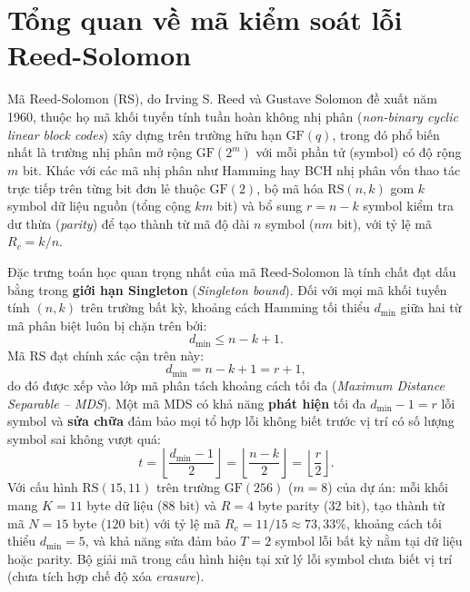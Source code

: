 \documentclass[12pt,a4paper]{report}
\begin{document}
\section{Tổng quan về mã kiểm soát lỗi Reed-Solomon}

Mã Reed-Solomon (RS), do Irving S. Reed và Gustave Solomon đề xuất năm 1960, thuộc họ mã khối tuyến tính tuần hoàn không nhị phân (\textit{non-binary cyclic linear block codes}) xây dựng trên trường hữu hạn $\text{GF}(q)$, trong đó phổ biến nhất là trường nhị phân mở rộng $\text{GF}(2^m)$ với mỗi phần tử (symbol) có độ rộng $m$ bit. Khác với các mã nhị phân như Hamming hay BCH nhị phân vốn thao tác trực tiếp trên từng bit đơn lẻ thuộc $\text{GF}(2)$, bộ mã hóa $\text{RS}(n, k)$ gom $k$ symbol dữ liệu nguồn (tổng cộng $km$ bit) và bổ sung $r = n - k$ symbol kiểm tra dư thừa (\textit{parity}) để tạo thành từ mã độ dài $n$ symbol ($nm$ bit), với tỷ lệ mã $R_c = k/n$.

Đặc trưng toán học quan trọng nhất của mã Reed-Solomon là tính chất đạt dấu bằng trong \textbf{giới hạn Singleton} (\textit{Singleton bound}). Đối với mọi mã khối tuyến tính $(n, k)$ trên trường bất kỳ, khoảng cách Hamming tối thiểu $d_{\min}$ giữa hai từ mã phân biệt luôn bị chặn trên bởi:
\begin{equation}
    d_{\min} \le n - k + 1.
    \label{eq:singleton-bound}
\end{equation}
Mã RS đạt chính xác cận trên này:
\begin{equation}
    d_{\min} = n - k + 1 = r + 1,
    \label{eq:mds-dmin}
\end{equation}
do đó được xếp vào lớp mã phân tách khoảng cách tối đa (\textit{Maximum Distance Separable -- MDS}). Một mã MDS có khả năng \textbf{phát hiện} tối đa $d_{\min} - 1 = r$ lỗi symbol và \textbf{sửa chữa} đảm bảo mọi tổ hợp lỗi không biết trước vị trí có số lượng symbol sai không vượt quá:
\begin{equation}
    t = \left\lfloor \frac{d_{\min} - 1}{2} \right\rfloor = \left\lfloor \frac{n - k}{2} \right\rfloor = \left\lfloor \frac{r}{2} \right\rfloor.
    \label{eq:rs-t-cap}
\end{equation}
Với cấu hình $\text{RS}(15,11)$ trên trường $\text{GF}(256)$ ($m = 8$) của dự án: mỗi khối mang $K = 11$ byte dữ liệu ($88\text{ bit}$) và $R = 4$ byte parity ($32\text{ bit}$), tạo thành từ mã $N = 15$ byte ($120\text{ bit}$) với tỷ lệ mã $R_c = 11/15 \approx 73{,}33\%$, khoảng cách tối thiểu $d_{\min} = 5$, và khả năng sửa đảm bảo $T = 2$ symbol lỗi bất kỳ nằm tại dữ liệu hoặc parity. Bộ giải mã trong cấu hình hiện tại xử lý lỗi symbol chưa biết vị trí (chưa tích hợp chế độ xóa \textit{erasure}).
\end{document}
